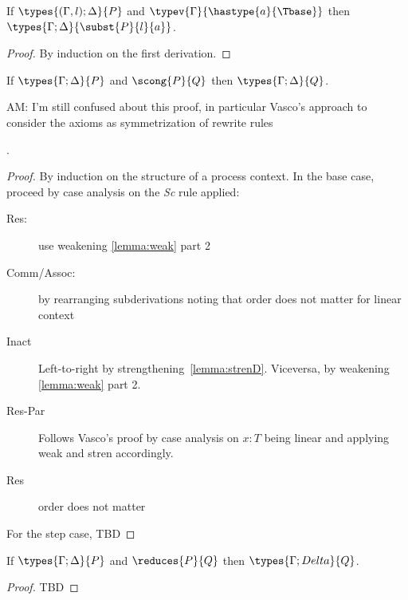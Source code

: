 \begin{lemma}[Substitution]\mbox{}
  If $\types{(\Gamma, l);\Delta}{P}$ and ${\typev{\Gamma}{\hastype{a}{\Tbase}}}$ then
  \( \types{\Gamma;\Delta}{\subst{P}{l}{a}} \).
\end{lemma}
\begin{proof}
  By induction on the first derivation.
\end{proof}
\begin{lemma}
  If \( \types{\Gamma;\Delta}{P} \) and \( \scong{P}{Q} \) then \( \types{\Gamma;\Delta}{Q} \).
\end{lemma}
\begin{metanote}
  AM: I'm still confused about this proof, in particular Vasco's approach to consider the axioms as symmetrization of rewrite rules
\end{metanote}.
\begin{proof}
  By induction on the structure of a process context. In the base case, proceed by case analysis on the \textsl{Sc} rule applied:
  \begin{description}
  \item[Res:] use weakening \ref{lemma:weak} part 2
  \item[Comm/Assoc:] by rearranging subderivations noting that  order does not matter for linear context
  \item[Inact] Left-to-right by strengthening~\ref{lemma:strenD}. Viceversa, by weakening \ref{lemma:weak} part 2.
  \item[Res-Par] Follows Vasco's proof by case analysis on $x : T$ being linear and applying weak and stren accordingly.
  \item[Res] order does not matter
  \end{description}
  For the step case, TBD
\end{proof}
\begin{theorem}
  If \( \types{\Gamma;\Delta}{P} \) and \( \reduces{P}{Q} \) then \( \types{\Gamma;Delta}{Q} \).
\end{theorem}
\begin{proof}
  TBD
\end{proof}

